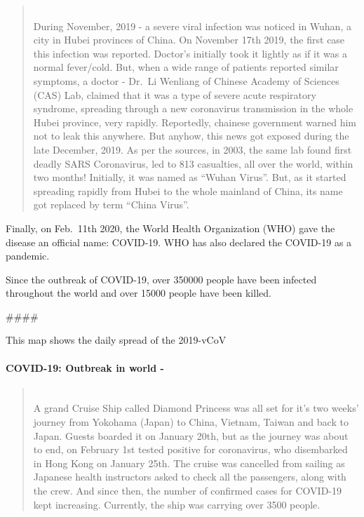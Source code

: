 \documentclass[11pt]{article}
\begin{document}
\begin{quote}
~\\
During November, 2019 - a severe viral infection was noticed in Wuhan, a
city in Hubei provinces of China. On November 17th 2019, the first case
this infection was reported. Doctor's initially took it lightly as if it
was a normal fever/cold. But, when a wide range of patients reported
similar symptoms, a doctor - Dr.~Li Wenliang of Chinese Academy of
Sciences (CAS) Lab, claimed that it was a type of severe acute
respiratory syndrome, spreading through a new coronavirus transmission
in the whole Hubei province, very rapidly. Reportedly, chainese
government warned him not to leak this anywhere. But anyhow, this news
got exposed during the late December, 2019. As per the sources, in 2003,
the same lab found first deadly SARS Coronavirus, led to 813 casualties,
all over the world, within two months! Initially, it was named as
``Wuhan Virus''. But, as it started spreading rapidly from Hubei to the
whole mainland of China, its name got replaced by term ``China Virus''.
\end{quote}

Finally, on Feb.~11th 2020, the World Health Organization (WHO) gave the
disease an official name: COVID-19. WHO has also declared the COVID-19
as a pandemic.

Since the outbreak of COVID-19, over 350000 people have been infected
throughout the world and over 15000 people have been killed.

\#\#\#\#

This map shows the daily spread of the 2019-vCoV

\hypertarget{covid-19-outbreak-in-world--}{%
\paragraph{COVID-19: Outbreak in world
-}\label{covid-19-outbreak-in-world--}}

\begin{quote}
~\\
A grand Cruise Ship called Diamond Princess was all set for it's two
weeks' journey from Yokohama (Japan) to China, Vietnam, Taiwan and back
to Japan. Guests boarded it on January 20th, but as the journey was
about to end, on February 1st tested positive for coronavirus, who
disembarked in Hong Kong on January 25th. The cruise was cancelled from
sailing as Japanese health instructors asked to check all the
passengers, along with the crew. And since then, the number of confirmed
cases for COVID-19 kept increasing. Currently, the ship was carrying
over 3500 people.
\end{quote}
\end{document}
